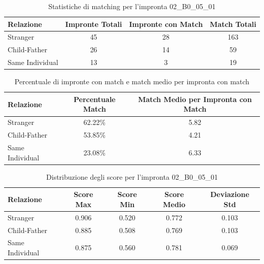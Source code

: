 \begin{table}[htbp]
\centering
\caption{Statistiche di matching per l'impronta 02\_B0\_05\_01}
\label{tab:results_02_B0_05_01}
\begin{tabular}{|l|c|c|c|}
\hline
\textbf{Relazione} & \textbf{Impronte Totali} & \textbf{Impronte con Match} & \textbf{Match Totali} \\
\hline
Stranger & 45 & 28 & 163 \\
\hline
Child-Father & 26 & 14 & 59 \\
\hline
Same Individual & 13 & 3 & 19 \\
\hline
\end{tabular}
\end{table}


\begin{table}[htbp]
\centering
\caption{Percentuale di impronte con match e match medio per impronta con match}
\label{tab:match_percentage_02_B0_05_01}
\begin{tabular}{|l|c|c|}
\hline
\textbf{Relazione} & \textbf{Percentuale Match} & \textbf{Match Medio per Impronta con Match} \\
\hline
Stranger & 62.22\% & 5.82 \\
\hline
Child-Father & 53.85\% & 4.21 \\
\hline
Same Individual & 23.08\% & 6.33 \\
\hline
\end{tabular}
\end{table}


\begin{table}[htbp]
\centering
\caption{Distribuzione degli score per l'impronta 02\_B0\_05\_01}
\label{tab:scores_02_B0_05_01}
\begin{tabular}{|l|c|c|c|c|}
\hline
\textbf{Relazione} & \textbf{Score Max} & \textbf{Score Min} & \textbf{Score Medio} & \textbf{Deviazione Std} \\
\hline
Stranger & 0.906 & 0.520 & 0.772 & 0.103 \\
\hline
Child-Father & 0.885 & 0.508 & 0.769 & 0.103 \\
\hline
Same Individual & 0.875 & 0.560 & 0.781 & 0.069 \\
\hline
\end{tabular}
\end{table}

